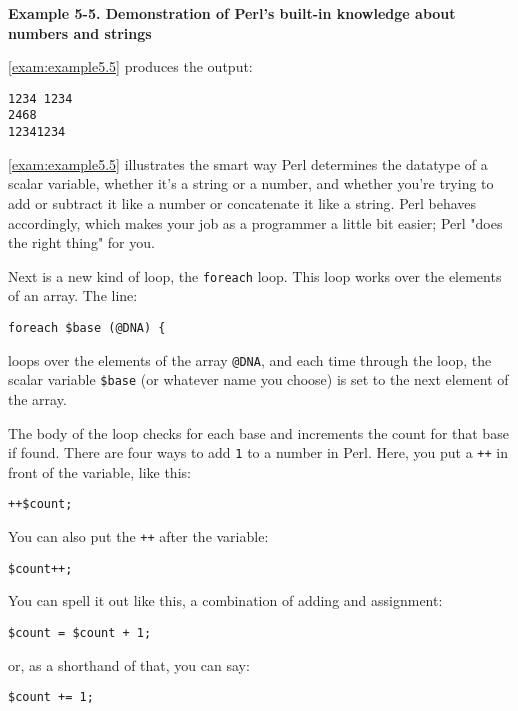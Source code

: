 \textbf{Example 5-5. Demonstration of Perl's built-in knowledge about numbers and strings}


\autoref{exam:example5.5} produces the output:

\begin{lstlisting}
1234 1234
2468
12341234
\end{lstlisting}

\autoref{exam:example5.5} illustrates the smart way Perl determines the datatype of a scalar variable, whether it's a string or a number, and whether you're trying to add or subtract it like a number or concatenate it like a string. Perl behaves accordingly, which makes your job as a programmer a little bit easier; Perl "does the right thing" for you.

Next is a new kind of loop, the \verb|foreach| loop. This loop works over the elements of an array. The line: 

\begin{lstlisting}
foreach $base (@DNA) {
\end{lstlisting}

loops over the elements of the array \verb|@DNA|, and each time through the loop, the scalar variable \verb|$base| (or whatever name you choose) is set to the next element of the array.

The body of the loop checks for each base and increments the count for that base if found. There are four ways to add \verb|1| to a number in Perl.  Here, you put a \verb|++| in front of the variable, like this:

\begin{lstlisting}
++$count; 
\end{lstlisting}

You can also put the \verb|++| after the variable:

\begin{lstlisting}
$count++;
\end{lstlisting}

You can spell it out like this, a combination of adding and assignment:

\begin{lstlisting}
$count = $count + 1;
\end{lstlisting}

or, as a shorthand of that, you can say:

\begin{lstlisting}
$count += 1;
\end{lstlisting}

